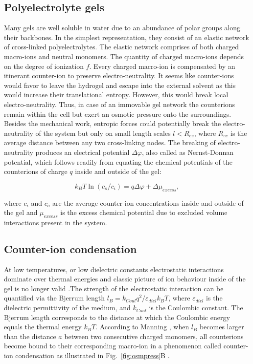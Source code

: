 \documentclass[twoside,twocolumn,9pt]{article}
\begin{document}
\subsection{Polyelectrolyte gels}

Many gels are well soluble in water due to an abundance of polar groups along their backbones. In the simplest representation, they consist of an elastic network of cross-linked polyelectrolytes. The elastic network comprises of both charged macro-ions and neutral monomers. The quantity of charged macro-ions depends on the degree of ionization $f$. Every charged macro-ion is compensated by an itinerant counter-ion to preserve electro-neutrality. It seems like counter-ions would favor to leave the hydrogel and escape into the external solvent as this would increase their translational entropy. However, this would break local electro-neutrality. Thus, in case of an immovable gel network the counterions remain within the cell but exert an osmotic pressure onto the surroundings. Besides the mechanical work, entropic forces could potentially break the electro-neutrality of the system but only on small length scales $l < R_{ee}$, where $R
_{ee}$ is the average distance between any two cross-linking nodes. The breaking of electro-neutrality produces an electrical potential $\Delta \varphi$, also called as Nernst-Donnan potential, which follows readily from equating the chemical potentials of the counterions of charge $q$ inside and outside of the gel:

\begin{equation}\label{eq:donnanpotential}
k_B T \ln (c_o/c_i)= q \Delta \varphi + \Delta \mu_{excess} ,
\end{equation}

where $c_i$ and $c_o$ are the average counter-ion concentrations inside and outside of the gel and $\mu_{excess}$ is the excess chemical potential due to excluded volume interactions present in the system.



\subsection{Counter-ion condensation}

At low temperatures, or low dielectric constants electrostatic interactions dominate over thermal energies and classic picture of ion behaviour inside of the gel is no longer valid \cite{Osada2002}.The strength of the electrostatic interaction can be quantified via the Bjerrum length $l_B = k_{Coul} q^2/\varepsilon_{diel} k_B T$, where $\varepsilon_{diel}$ is the dielectric permittivity of the medium, and $k_{Coul}$ is the Coulombic constant. The Bjerrum length corresponds to the distance at which the Coulombic energy equals the thermal energy $k_BT$. According to Manning \cite{Manning_1977}, when $l_B$ becomes larger than the distance $a$ between two consecutive charged monomers, all counterions become bound to their corresponding macro-ion in a phenomenon called counter-ion condensation as illustrated in Fig.~\ref{fig:osmpress}B \cite{Mann2005}.
\end{document}
